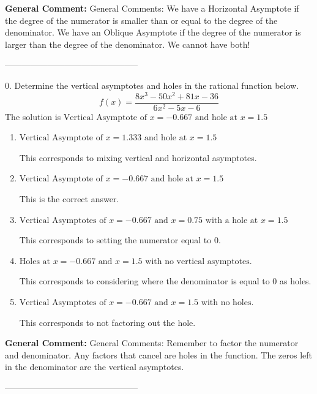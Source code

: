 \documentclass{extbook}[14pt]
\begin{document}
\textbf{General Comment:} General Comments: We have a Horizontal Asymptote if the degree of the numerator is smaller than or equal to the degree of the denominator. We have an Oblique Asymptote if the degree of the numerator is larger than the degree of the denominator. We cannot have both! 

-----------------------------------------------

0. Determine the vertical asymptotes and holes in the rational function below.
\[ f(x) = \frac{8x^{3} -50 x^{2} +81 x -36}{6x^{2} -5 x -6} \] 
The solution is $ \text{Vertical Asymptote of } x = -0.667 \text{ and hole at } x = 1.5 $ 

\begin{enumerate}[label=\Alph*.] 
\item $ \text{Vertical Asymptote of } x = 1.333 \text{ and hole at } x = 1.5 $ 

 This corresponds to mixing vertical and horizontal asymptotes. 
\item $ \text{Vertical Asymptote of } x = -0.667 \text{ and hole at } x = 1.5 $ 

 This is the correct answer. 
\item $ \text{Vertical Asymptotes of } x = -0.667 \text{ and } x = 0.75 \text{ with a hole at } x = 1.5 $ 

 This corresponds to setting the numerator equal to 0. 
\item $ \text{Holes at } x = -0.667 \text{ and } x = 1.5 \text{ with no vertical asymptotes.} $ 

 This corresponds to considering where the denominator is equal to 0 as holes. 
\item $ \text{Vertical Asymptotes of } x = -0.667 \text{ and } x = 1.5 \text{ with no holes.} $ 

 This corresponds to not factoring out the hole. 
\end{enumerate} 
 
\textbf{General Comment:} General Comments: Remember to factor the numerator and denominator. Any factors that cancel are holes in the function. The zeros left in the denominator are the vertical asymptotes. 

-----------------------------------------------
\end{document}
